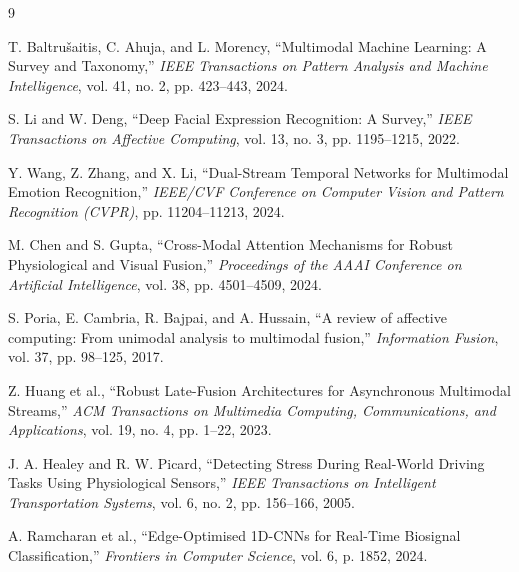 \documentclass[12pt, a4paper]{article}
\begin{document}
\begin{thebibliography}{9}

T. Baltru\v{s}aitis, C. Ahuja, and L. Morency, ``Multimodal Machine Learning: A Survey and Taxonomy,'' \textit{IEEE Transactions on Pattern Analysis and Machine Intelligence}, vol. 41, no. 2, pp. 423--443, 2024.

S. Li and W. Deng, ``Deep Facial Expression Recognition: A Survey,'' \textit{IEEE Transactions on Affective Computing}, vol. 13, no. 3, pp. 1195--1215, 2022.

Y. Wang, Z. Zhang, and X. Li, ``Dual-Stream Temporal Networks for Multimodal Emotion Recognition,'' \textit{IEEE/CVF Conference on Computer Vision and Pattern Recognition (CVPR)}, pp. 11204--11213, 2024.

M. Chen and S. Gupta, ``Cross-Modal Attention Mechanisms for Robust Physiological and Visual Fusion,'' \textit{Proceedings of the AAAI Conference on Artificial Intelligence}, vol. 38, pp. 4501--4509, 2024.

S. Poria, E. Cambria, R. Bajpai, and A. Hussain, ``A review of affective computing: From unimodal analysis to multimodal fusion,'' \textit{Information Fusion}, vol. 37, pp. 98--125, 2017.

Z. Huang et al., ``Robust Late-Fusion Architectures for Asynchronous Multimodal Streams,'' \textit{ACM Transactions on Multimedia Computing, Communications, and Applications}, vol. 19, no. 4, pp. 1--22, 2023.

J. A. Healey and R. W. Picard, ``Detecting Stress During Real-World Driving Tasks Using Physiological Sensors,'' \textit{IEEE Transactions on Intelligent Transportation Systems}, vol. 6, no. 2, pp. 156--166, 2005.

A. Ramcharan et al., ``Edge-Optimised 1D-CNNs for Real-Time Biosignal Classification,'' \textit{Frontiers in Computer Science}, vol. 6, p. 1852, 2024.

\end{thebibliography}
\end{document}

